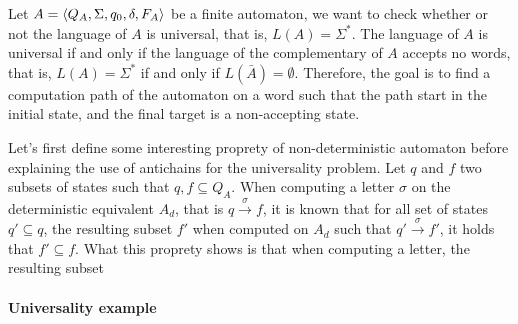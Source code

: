 \documentclass[letterpaper]{article}
\DeclarePairedDelimiter{\ceil}{\lceil}{\rceil}
\DeclarePairedDelimiter{\tuple}{\langle}{\rangle}
\theoremstyle{definition}
\begin{document}
Let $A = \tuple{Q_A, \Sigma, q_0, \delta, F_A}$ be a finite automaton,
we want to check whether or not
the language of $A$ is universal, that is, $L(A) = \Sigma^*$.
The language of $A$ is universal if and only if the language
of the complementary of $A$ accepts no words, that is,
$L(A) = \Sigma^*$ if and only if $L(\bar{A}) = \emptyset$.
Therefore, the goal is to find a computation path of the
automaton on a word such that the path start in the initial state,
and the final target is a non-accepting state.

Let's first define some interesting proprety of non-deterministic automaton
before explaining the use of antichains for the universality problem.
Let $q$ and $f$ two subsets of states such that $q, f \subseteq Q_A$.
When computing a letter $\sigma$ on the deterministic equivalent
$A_d$, that is $q \xrightarrow{\sigma} f$, it is known that
for all set of states $q' \subseteq q$, the resulting subset
$f'$ when computed on $A_d$ such that $q' \xrightarrow{\sigma} f'$,
it holds that $f' \subseteq f$. What this proprety shows is that
when computing a letter, the resulting subset




\paragraph{Universality example}
\end{document}
